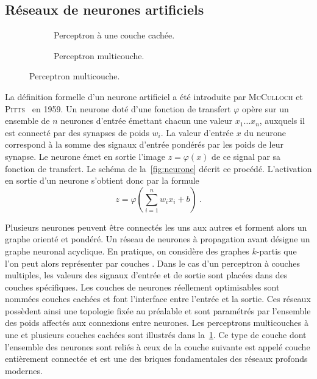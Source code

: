 \subsection{Réseaux de neurones artificiels}

\begin{figure}[t]
  \begin{subfigure}[b]{0.5\textwidth}
    \resizebox{\textwidth}{!}{
    
    }
  \caption{Perceptron à une couche cachée.}
  \end{subfigure}%
  \begin{subfigure}[b]{0.5\textwidth}
    \resizebox{\textwidth}{!}{
    
    }
  \caption{Perceptron multicouche.}
  \end{subfigure}
  \label{fig:perceptron}
\end{figure}

La définition formelle d'un neurone artificiel a été introduite par \textsc{McCulloch} et \textsc{Pitts}~\cite{lettvin_what_1959} en 1959. Un neurone doté d'une fonction de transfert $\varphi$ opère sur un ensemble de $n$ neurones d'entrée émettant chacun une valeur $x_1\dots{}x_n$, auxquels il est connecté par des synapses de poids $w_i$. La valeur d'entrée $x$ du neurone correspond à la somme des signaux d'entrée pondérés par les poids de leur synapse. Le neurone émet en sortie l'image $z = \varphi(x)$ de ce signal par sa fonction de transfert. Le schéma de la~\cref{fig:neurone} décrit ce procédé. L'activation en sortie d'un neurone s'obtient donc par la formule
\begin{equation}
z = \varphi\left(\sum_{i=1}^n w_i x_i + b\right)~.
\end{equation}

Plusieurs neurones peuvent être connectés les uns aux autres et forment alors un graphe orienté et pondéré. Un réseau de neurones à propagation avant désigne un graphe neuronal acyclique. En pratique, on considère des graphes $k$-partis que l'on peut alors représenter par \og couches \fg. Dans le cas d'un perceptron à couches multiples, les valeurs des signaux d'entrée et de sortie sont placées dans des couches spécifiques. Les couches de neurones réellement optimisables sont nommées \og couches cachées \fg{} et font l'interface entre l'entrée et la sortie. Ces réseaux possèdent ainsi une topologie fixée au préalable et sont paramétrés par l'ensemble des poids affectés aux connexions entre neurones. Les perceptrons multicouches à une et plusieurs couches cachées sont illustrés dans la~\cref{fig:perceptron}. Ce type de couche dont l'ensemble des neurones sont reliés à ceux de la couche suivante est appelé \og couche entièrement connectée \fg et est une des briques fondamentales des réseaux profonds modernes.

